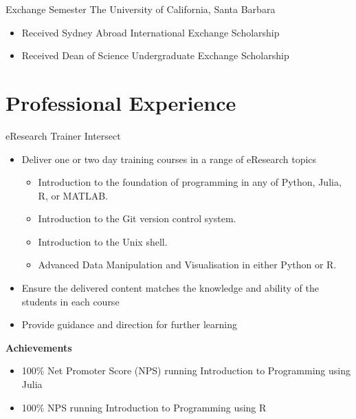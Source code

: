 {Exchange Semester}
{The University of California, Santa Barbara}{}{}
{%
\begin{itemize}
  \item Received Sydney Abroad International Exchange Scholarship
  \item Received Dean of Science Undergraduate Exchange Scholarship
\end{itemize}
}

\nocite{*}
\printbibliography[title={Publications}]

\pagebreak
\section{Professional Experience}

{eResearch Trainer}
{Intersect}{}{}
{%
  \begin{itemize}
    \item Deliver one or two day training courses in a range of eResearch topics
      \begin{itemize}
        \item Introduction to the foundation of programming in any of Python, Julia, R, or MATLAB.
        \item Introduction to the Git version control system.
        \item Introduction to the Unix shell.
        \item Advanced Data Manipulation and Visualisation in either Python or R.
      \end{itemize}
    \item Ensure the delivered content matches the knowledge and ability of the students in each
      course
    \item Provide guidance and direction for further learning
  \end{itemize}
  \textbf{Achievements}
  \begin{itemize}
    \item 100\% Net Promoter Score (NPS) running Introduction to Programming using Julia
    \item 100\% NPS running Introduction to Programming using R
  \end{itemize}
}

